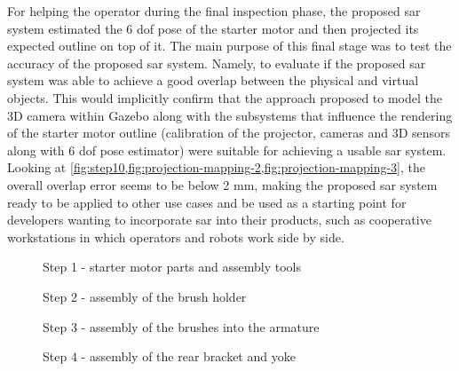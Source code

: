 For helping the operator during the final inspection phase, the proposed \gls{sar} system estimated the 6 \gls{dof} pose of the starter motor and then projected its expected outline on top of it. The main purpose of this final stage was to test the accuracy of the proposed \gls{sar} system. Namely, to evaluate if the proposed \gls{sar} system was able to achieve a good overlap between the physical and virtual objects. This would implicitly confirm that the approach proposed to model the 3D camera within Gazebo along with the subsystems that influence the rendering of the starter motor outline (calibration of the projector, cameras and 3D sensors along with 6 \gls{dof} pose estimator) were suitable for achieving a usable \gls{sar} system. Looking at \cref{fig:step10,fig:projection-mapping-2,fig:projection-mapping-3}, the overall overlap error seems to be below 2 mm, making the proposed \gls{sar} system ready to be applied to other use cases and be used as a starting point for developers wanting to incorporate \gls{sar} into their products, such as cooperative workstations in which operators and robots work side by side.

\begin{figure}[H]
	\begin{floatrow}[2]
		{\caption{Step 1 - starter motor parts and assembly tools}\label{fig:assembly-parts}\vspace{-0.5em}}
		{\caption{Step 2 - assembly of the brush holder}\label{fig:step2}\vspace{-0.5em}}
	\end{floatrow}
\end{figure}

\vspace{-1.5em}
\begin{figure}[H]
	\begin{floatrow}[2]
		{\caption{Step 3 - assembly of the brushes into the armature}\label{fig:step3}\vspace{-0.5em}}
		{\caption{Step 4 - assembly of the rear bracket and yoke}\label{fig:step4}\vspace{-0.5em}}
	\end{floatrow}
\end{figure}

